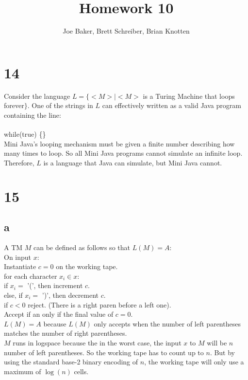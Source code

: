 \documentclass[letterpaper,notitlepage,twoside]{article}
\newcommand\tab[1][1cm]{\hspace*{#1}} %
\begin{document}
\title{Homework 10}
\author{Joe Baker, Brett Schreiber, Brian Knotten}
\maketitle

\section*{14}
Consider the language $L = \{<M> \mid <M> $ is a Turing Machine that loops forever$\}$.
One of the strings in $L$ can effectively written as a valid Java program containing the line: \\\\

while(true) \{\} \\

Mini Java's looping mechanism must be given a finite number describing how many times to loop. So all Mini Java programs cannot simulate an infinite loop. Therefore, $L$ is a language that Java can simulate, but Mini Java cannot.

\section*{15}
\subsection*{a}
A TM $M$ can be defined as follows so that $L(M) = A$: \\
On input $x$: \\
\tab Instantiate $c = 0$ on the working tape. \\
\tab for each character $x_i \in x$: \\
\tab\tab if $x_i =$ '(', then increment $c$. \\
\tab\tab else, if $x_i =$ ')', then decrement $c$. \\
\tab\tab if $c < 0$ reject. (There is a right paren before a left one). \\
\tab Accept if an only if the final value of $c = 0$. \\
$L(M) = A$ because $L(M)$ only accepts when the number of left parentheses matches the number of right parentheses. \\
$M$ runs in logspace because the in the worst case, the input $x$ to $M$ will be $n$ number of left parentheses. So the working tape has to count up to $n$. But by using the standard base-2 binary encoding of $n$, the working tape will only use a maximum of $\log(n)$ cells. \\
\end{document}
